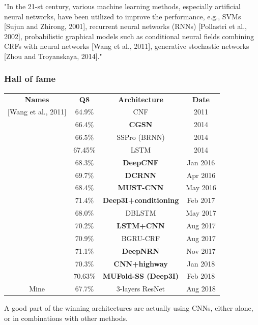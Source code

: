 	"In the 21-st century, various machine learning methods, especially artificial neural networks, have been utilized to improve the performance, e.g., SVMs [Sujun and Zhirong, 2001], recurrent neural networks (RNNs) [Pollastri et al., 2002], probabilistic graphical models such as conditional neural fields combining CRFs with neural networks [Wang et al., 2011], generative stochastic networks [Zhou and Troyanskaya, 2014]." \cite{Li2016}

	\subsubsection{Hall of fame}\label{sect:HoF}
	\begin{table}[h]
		\begin{tabular}{cccc}
			\textbf{Names} & \textbf{Q8} & \textbf{Architecture} & \textbf{Date} \\
			$[$Wang et al., 2011$]$	& 64.9\% 	& CNF 			& 2011 \\ 
			\cite{Zhou2014}	& 66.4\% 	& \textbf{CGSN} 			& 2014 \\ 
			\cite{Magnan2014} & 66.5\% & SSPro (BRNN) & 2014 \\
			\cite{Sønderby2014}	& 67.45\% 	& LSTM 			& 2014 	\\ 
			\cite{Wang2016} & 68.3\% & \textbf{DeepCNF} 	& Jan 2016 \\ 
			\cite{Li2016}	& 69.7\% 	& \textbf{DCRNN} 		& Apr 2016 \\
			\cite{Lin2016} 	& 68.4\% 	& \textbf{MUST-CNN} 		& May 2016 \\
			\cite{Busia2017}& 71.4\%& \textbf{Deep3I+conditioning}& Feb 2017 \\
			\cite{Hattori2017} & 68.0\%	& DBLSTM		& May 2017 \\
			\cite{Jurtz2017} & 70.2\%	& \textbf{LSTM+CNN} 		& Aug 2017 \\
			\cite{Johansen2017} & 70.9\% & BGRU-CRF & Aug 2017 \\
			\cite{8371925} & 71.1\% & \textbf{DeepNRN} & Nov 2017 \\
			\cite{Zhou2018} & 70.3\% & \textbf{CNN+highway} & Jan 2018 \\
			\cite{Fang2017}& 70.63\% & \textbf{MUFold-SS (Deep3I)}&Feb 2018\\
			
			Mine & 67.7\% & 3-layers ResNet & Aug 2018 \\ 
		\end{tabular}
	\end{table}
	
	A good part of the winning architectures are actually using CNNs, either alone, or in combinations with other methods.